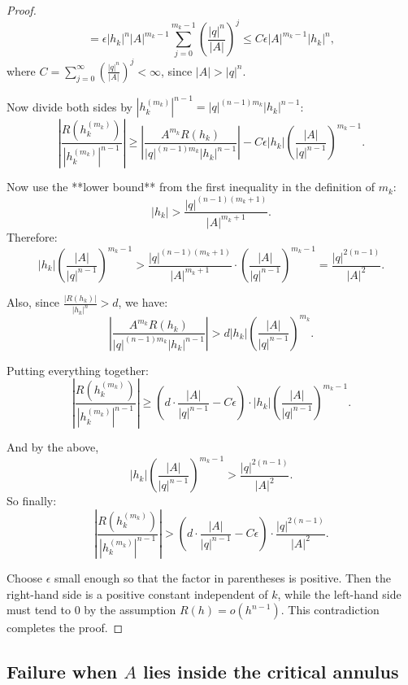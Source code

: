 \documentclass{raex}
\theoremstyle{definition}
\begin{document}
\begin{proof}
\[
= \epsilon |h_k|^n |A|^{m_k - 1} \sum_{j=0}^{m_k - 1} \left( \frac{|q|^n}{|A|} \right)^j
\leq C \epsilon |A|^{m_k - 1} |h_k|^n,
\]
where \( C = \sum_{j=0}^{\infty} \left( \frac{|q|^n}{|A|} \right)^j < \infty \), since \( |A| > |q|^n \).

Now divide both sides by \( |h_k^{(m_k)}|^{n-1} = |q|^{(n-1)m_k} |h_k|^{n-1} \):
\[
\left| \frac{R(h_k^{(m_k)})}{|h_k^{(m_k)}|^{n-1}} \right|
\geq \left| \frac{A^{m_k} R(h_k)}{|q|^{(n-1)m_k} |h_k|^{n-1}} \right|
- C \epsilon |h_k| \left( \frac{|A|}{|q|^{n-1}} \right)^{m_k - 1}.
\]

Now use the **lower bound** from the first inequality in the definition of \( m_k \):
\[
|h_k| > \frac{|q|^{(n-1)(m_k+1)}}{|A|^{m_k+1}}.
\]
Therefore:
\[
|h_k| \left( \frac{|A|}{|q|^{n-1}} \right)^{m_k - 1}
> \frac{|q|^{(n-1)(m_k+1)}}{|A|^{m_k+1}} \cdot \left( \frac{|A|}{|q|^{n-1}} \right)^{m_k - 1}
= \frac{|q|^{2(n-1)}}{|A|^2}.
\]

Also, since \( \frac{|R(h_k)|}{|h_k|^n} > d \), we have:
\[
\left| \frac{A^{m_k} R(h_k)}{|q|^{(n-1)m_k} |h_k|^{n-1}} \right|
> d |h_k| \left( \frac{|A|}{|q|^{n-1}} \right)^{m_k}.
\]

Putting everything together:
\[
\left| \frac{R(h_k^{(m_k)})}{|h_k^{(m_k)}|^{n-1}} \right|
\geq \left( d \cdot \frac{|A|}{|q|^{n-1}} - C \epsilon \right)
\cdot |h_k| \left( \frac{|A|}{|q|^{n-1}} \right)^{m_k - 1}.
\]

And by the above,
\[
|h_k| \left( \frac{|A|}{|q|^{n-1}} \right)^{m_k - 1}
> \frac{|q|^{2(n-1)}}{|A|^2}.
\]
So finally:
\[
\left| \frac{R(h_k^{(m_k)})}{|h_k^{(m_k)}|^{n-1}} \right|
> \left( d \cdot \frac{|A|}{|q|^{n-1}} - C \epsilon \right)
\cdot \frac{|q|^{2(n-1)}}{|A|^2}.
\]

Choose \( \epsilon \) small enough so that the factor in parentheses is positive. Then the right-hand side is a positive constant independent of \( k \), while the left-hand side must tend to 0 by the assumption \( R(h) = o(h^{n-1}) \). This contradiction completes the proof.
\end{proof}




\subsection{Failure when \( A \) lies inside the critical annulus}
\end{document}
